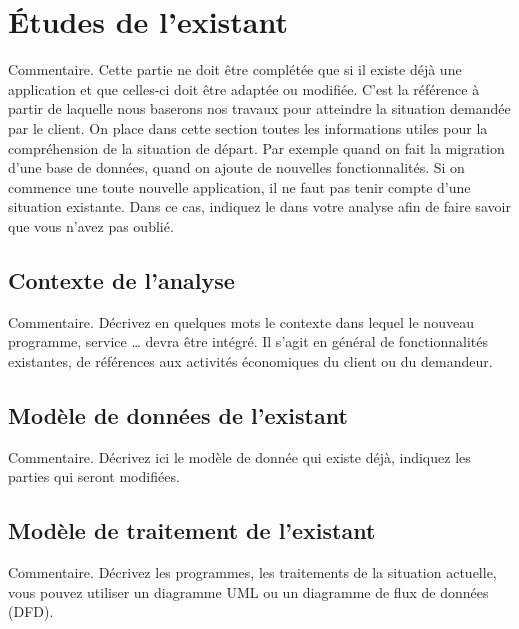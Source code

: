 \section{Études de l'existant}
Commentaire.  Cette partie ne doit être complétée que si il existe déjà une application et que celles-ci doit être adaptée ou modifiée.  C’est la référence à partir de laquelle nous baserons nos travaux pour atteindre la situation demandée par le client.  On place dans cette section toutes les informations utiles pour la compréhension de la situation de départ.  Par exemple quand on fait la migration d’une base de données, quand on ajoute de nouvelles fonctionnalités.  Si on commence une toute nouvelle application, il ne faut pas tenir compte d’une situation existante.  Dans ce cas, indiquez le dans votre analyse afin de faire savoir que vous n’avez pas oublié.

\subsection{Contexte de l'analyse}
Commentaire.  Décrivez en quelques mots le contexte dans lequel le nouveau programme, service … devra être intégré.  Il s’agit en général de fonctionnalités existantes, de références aux activités économiques du client ou du demandeur.

\subsection{Modèle de données de l'existant}
Commentaire.  Décrivez ici le modèle de donnée qui existe déjà, indiquez les parties qui seront modifiées.

\subsection{Modèle de traitement de l'existant}
Commentaire.  Décrivez les programmes, les traitements de la situation actuelle, vous pouvez utiliser un diagramme UML ou un diagramme de flux de données (DFD).